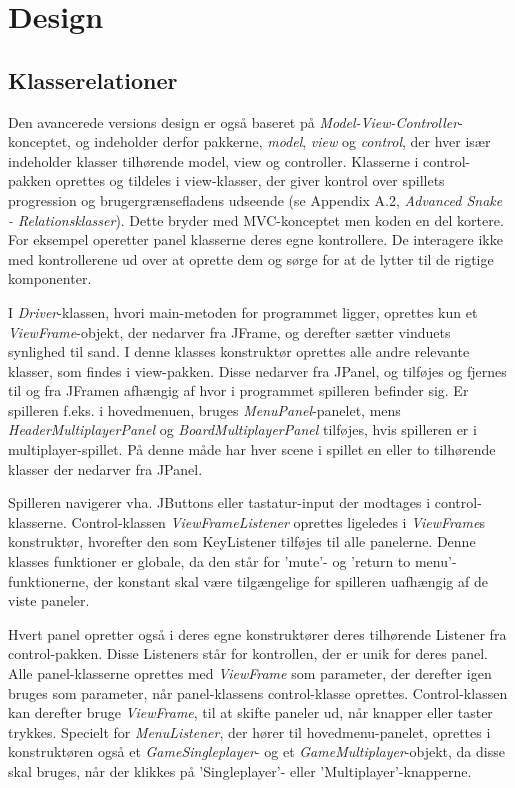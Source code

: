 \section{Design}

\subsection{Klasserelationer}
Den avancerede versions design er også baseret på \textit{Model-View-Controller}-konceptet, og indeholder derfor pakkerne, \textit{model}, \textit{view} og \textit{control}, der hver især indeholder klasser tilhørende model, view og controller. Klasserne i control-pakken oprettes og tildeles i view-klasser, der giver kontrol over spillets progression og brugergrænsefladens udseende (se Appendix A.2, \textit{Advanced Snake - Relationsklasser}). Dette bryder med MVC-konceptet men koden en del kortere. For eksempel operetter panel klasserne deres egne kontrollere. De interagere ikke med kontrollerene ud over at oprette dem og sørge for at de lytter til de rigtige komponenter.
\newline

I \textit{Driver}-klassen, hvori main-metoden for programmet ligger, oprettes kun et \textit{ViewFrame}-objekt, der nedarver fra JFrame, og derefter sætter vinduets synlighed til sand. I denne klasses konstruktør oprettes alle andre relevante klasser, som findes i view-pakken. Disse nedarver fra JPanel, og tilføjes og fjernes til og fra JFramen afhængig af hvor i programmet spilleren befinder sig. Er spilleren f.eks. i hovedmenuen, bruges \textit{MenuPanel}-panelet, mens \textit{HeaderMultiplayerPanel} og \textit{BoardMultiplayerPanel} tilføjes, hvis spilleren er i multiplayer-spillet. På denne måde har hver scene i spillet en eller to tilhørende klasser der nedarver fra JPanel.
\newline

Spilleren navigerer vha. JButtons eller tastatur-input der modtages i control-klasserne. Control-klassen \textit{ViewFrameListener} oprettes ligeledes i \textit{ViewFrame}s konstruktør, hvorefter den som KeyListener tilføjes til alle panelerne. Denne klasses funktioner er globale, da den står for 'mute'- og 'return to menu'-funktionerne, der konstant skal være tilgængelige for spilleren uafhængig af de viste paneler.
\newline

Hvert panel opretter også i deres egne konstruktører deres tilhørende Listener fra control-pakken. Disse Listeners står for kontrollen, der er unik for deres panel. Alle panel-klasserne oprettes med \textit{ViewFrame} som parameter, der derefter igen bruges som parameter, når panel-klassens control-klasse oprettes. Control-klassen kan derefter bruge \textit{ViewFrame}, til at skifte paneler ud, når knapper eller taster trykkes. Specielt for \textit{MenuListener}, der hører til hovedmenu-panelet, oprettes i konstruktøren også et \textit{GameSingleplayer}- og et \textit{GameMultiplayer}-objekt, da disse skal bruges, når der klikkes på 'Singleplayer'- eller 'Multiplayer'-knapperne. 
\newline


